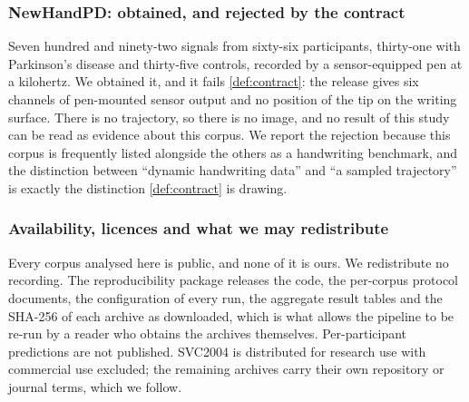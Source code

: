 \subsubsection{NewHandPD: obtained, and rejected by the contract}
\label{sec:newhandpd}

Seven hundred and ninety-two signals from sixty-six participants, thirty-one with Parkinson's
disease and thirty-five controls, recorded by a sensor-equipped pen at a kilohertz. We obtained it, and it
fails \cref{def:contract}: the release gives six channels of pen-mounted sensor output and no
position of the tip on the writing surface. There is no trajectory, so there is no image, and no
result of this study can be read as evidence about this corpus. We report the rejection because
this corpus is frequently listed alongside the others as a handwriting benchmark, and the
distinction between ``dynamic handwriting data'' and ``a sampled trajectory'' is exactly the
distinction \cref{def:contract} is drawing.

\subsubsection{Availability, licences and what we may redistribute}
\label{sec:availability}

Every corpus analysed here is public, and none of it is ours. We redistribute no recording.
The reproducibility package releases the code, the per-corpus protocol documents, the configuration
of every run, the aggregate result tables and the SHA-256 of each archive as downloaded, which is
what allows the pipeline to be re-run by a reader who obtains the archives themselves. Per-participant
predictions are not published. SVC2004 is distributed for research use with commercial use
excluded; the remaining archives carry their own repository or journal terms, which we follow.
